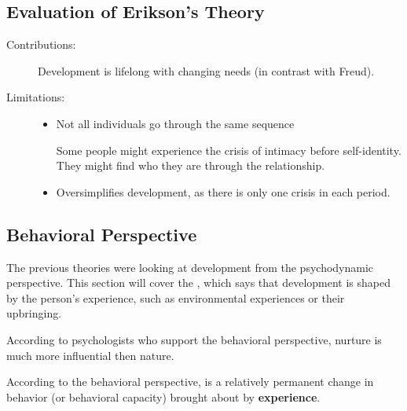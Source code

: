 \documentclass[../main/main.tex]{subfiles}
\begin{document}
\subsection{Evaluation of Erikson's Theory}
\begin{description}
  \item[Contributions:] Development is lifelong with changing needs (in contrast with Freud).
  \item[Limitations:]
        \begin{itemize}
          \item Not all individuals go through the same sequence
                \begin{example}
Some people might experience the crisis of intimacy before self-identity. They might find who they are through the relationship.
                \end{example}
                \item Oversimplifies development, as there is only one crisis in each period.
        \end{itemize}
\end{description}
\subsection{Behavioral Perspective} 
The previous theories were looking at development from the psychodynamic perspective. This section will cover the , which says that development is shaped by the person's experience, such as environmental experiences or their upbringing.

According to psychologists who support the behavioral perspective, nurture is much more influential then nature.
\begin{definition}
According to the behavioral perspective,  is a relatively permanent change in behavior (or behavioral capacity) brought about by \textbf{experience}. 
\end{definition}
\end{document}
